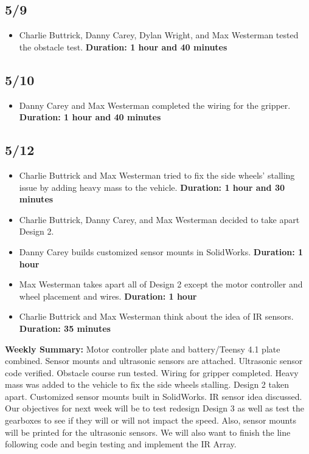 \documentclass[12pt]{report}
\begin{document}
\subsection*{5/9}

\begin{itemize}
    \item Charlie Buttrick, Danny Carey, Dylan Wright, and Max Westerman tested the obstacle test. \textbf{Duration: 1 hour and 40 minutes}
\end{itemize}

\subsection*{5/10}

\begin{itemize}
    \item Danny Carey and Max Westerman completed the wiring for the gripper. \textbf{Duration: 1 hour and 40 minutes}
\end{itemize}

\subsection*{5/12}

\begin{itemize}
    \item Charlie Buttrick and Max Westerman tried to fix the side wheels' stalling issue by adding heavy mass to the vehicle. \textbf{Duration: 1 hour and 30 minutes}
    \item Charlie Buttrick, Danny Carey, and Max Westerman decided to take apart Design 2.
    \item Danny Carey builds customized sensor mounts in SolidWorks. \textbf{Duration: 1 hour}
    \item Max Westerman takes apart all of Design 2 except the motor controller and wheel placement and wires. \textbf{Duration: 1 hour}
    \item Charlie Buttrick and Max Westerman think about the idea of IR sensors. \textbf{Duration: 35 minutes}
\end{itemize}

\textbf{Weekly Summary:} Motor controller plate and battery/Teensy 4.1 plate combined. Sensor mounts and ultrasonic sensors are attached. Ultrasonic sensor code verified. Obstacle course run tested. Wiring for gripper completed. Heavy mass was added to the vehicle to fix the side wheels stalling. Design 2 taken apart. Customized sensor mounts built in SolidWorks. \gls{IR} sensor idea discussed. Our objectives for next week will be to test redesign Design 3 as well as test the gearboxes to see if they will or will not impact the speed. Also, sensor mounts will be printed for the ultrasonic sensors. We will also want to finish the line following code and begin testing and implement the \gls{IR} Array.
\end{document}
